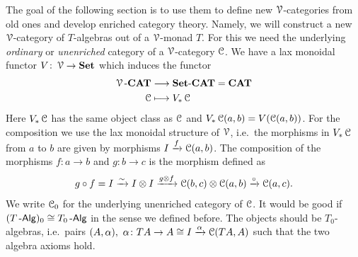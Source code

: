 \documentclass[a4paper,11pt,oneside,openany]{scrbook}
\begin{document}
The goal of the following section is to use them to define new $\V$-categories from old ones and develop enriched category theory. Namely, we will construct a new $\V$-category of $T$-algebras out of a $\V$-monad $T$. For this we need the underlying \emph{ordinary} or \emph{unenriched} category of a $\V$-category $\C$. We have a lax monoidal functor $V\colon\V\to\Set$ which induces the functor
\begin{align*}
	\V\mbox{-}\CAT & \longrightarrow\Set\mbox{-}\CAT=\CAT \\
	\C             & \longmapsto V_*\C
\end{align*}
Here $V_*\C$ has the same object class as $\C$ and $V_*\C(a,b)=V(\C(a,b))$. For
the composition we use the lax monoidal structure of $\V$, i.e.\ the morphisms
in $V_*\C$ from $a$ to $b$ are given by morphisms $I\xrightarrow{f}\C(a,b)$. The
composition of the morphisms $f\colon a\to b$ and $g\colon b\to c$ is the
morphism defined as
$$g\circ f = I\xrightarrow{\sim} I\otimes I\xrightarrow{g\otimes f}\C(b,c)\otimes\C(a,b)\xrightarrow{\circ}\C(a,c).$$
We write $\C_0$ for the underlying unenriched category of $\C$. It would be good
if $(T\Alg)_0\cong T_0\Alg$ in the sense we defined before. The objects
should be $T_0$-algebras, i.e.\ pairs $(A,\alpha), \ \alpha\colon TA\to A\cong
I\xrightarrow{\alpha}\C(TA,A)$ such that the two algebra axioms hold.
\end{document}
